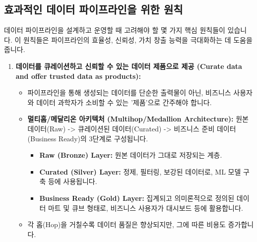\documentclass[11pt,a4paper]{article}
\begin{document}
\subsection{효과적인 데이터 파이프라인을 위한 원칙}

데이터 파이프라인을 설계하고 운영할 때 고려해야 할 몇 가지 핵심 원칙들이 있습니다. 이 원칙들은 파이프라인의 효율성, 신뢰성, 가치 창출 능력을 극대화하는 데 도움을 줍니다.

\begin{enumerate}
    \item \textbf{데이터를 큐레이션하고 신뢰할 수 있는 데이터 제품으로 제공 (Curate data and offer trusted data as products):}
    \begin{itemize}
        \item 파이프라인을 통해 생성되는 데이터를 단순한 출력물이 아닌, 비즈니스 사용자와 데이터 과학자가 소비할 수 있는 '제품'으로 간주해야 합니다.
        \item \textbf{멀티홉/메달리온 아키텍처 (Multihop/Medallion Architecture):} 원본 데이터(Raw) -> 큐레이션된 데이터(Curated) -> 비즈니스 준비 데이터(Business Ready)의 3단계로 구성됩니다.
        \begin{itemize}
            \item \textbf{Raw (Bronze) Layer:} 원본 데이터가 그대로 저장되는 계층.
            \item \textbf{Curated (Silver) Layer:} 정제, 필터링, 보강된 데이터로, ML 모델 구축 등에 사용됩니다.
            \item \textbf{Business Ready (Gold) Layer:} 집계되고 의미론적으로 정의된 데이터 마트 및 큐브 형태로, 비즈니스 사용자가 대시보드 등에 활용합니다.
        \end{itemize}
        \item 각 홉(Hop)을 거칠수록 데이터 품질은 향상되지만, 그에 따른 비용도 증가합니다.
    \end{itemize}


\end{enumerate}
\end{document}
